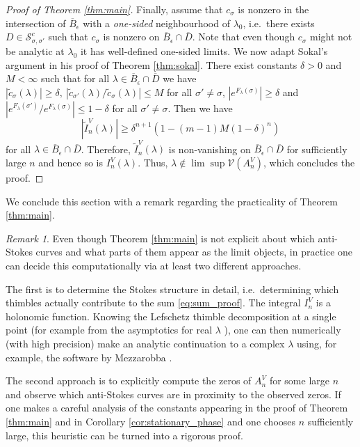 \documentclass[11pt, a4paper]{article}
\numberwithin{theorem}{section}
\theoremstyle{remark}
\newtheorem{remark}[theorem]{Remark}
\newcommand{\V}{\mathcal{V}}
\newcommand{\cS}{\mathcal{S}}
\theoremstyle{theorem}
\begin{document}
\begin{proof}[Proof of Theorem \ref{thm:main}]
  Finally, assume that $c_\sigma$ is nonzero in the intersection of $\overline{B}_\epsilon$ with a \emph{one-sided} neighbourhood of $\lambda_0$, i.e.\ there exists $D\in \cS^c_{\sigma,\sigma'}$ such that $c_\sigma$ is nonzero on $\overline{B}_\epsilon \cap \overline{D}$. 
  Note that even though $c_\sigma$ might not be analytic at $\lambda_0$ it has well-defined one-sided limits. We now adapt Sokal's argument in his proof of Theorem \ref{thm:sokal}. There exist constants $\delta > 0$ and $M < \infty$ such that for all $\lambda\in \overline{B}_\epsilon \cap \overline{D}$ we have $|\tilde{c}_\sigma(\lambda)| \geq \delta,~ | \tilde{c}_{\sigma'}(\lambda) / \tilde{c}_{\sigma}(\lambda) | \leq M$ for all $\sigma'\neq \sigma$, $|e^{F_\lambda(\sigma)}| \geq \delta$ and $| e^{F_\lambda(\sigma')} / e^{F_\lambda(\sigma)} | \leq 1-\delta$ for all $\sigma'\neq \sigma$. Then we have
  \[
    |\tilde{I}_n^V(\lambda)| \geq \delta^{n+1}\left( 1 - (m-1)M(1-\delta)^n \right)
  \]
  for all $\lambda\in \overline{B}_\epsilon \cap \overline{D}$. Therefore, $\tilde{I}_n^V(\lambda)$ is non-vanishing on $\overline{B}_\epsilon \cap \overline{D}$ for sufficiently large $n$ and hence so is $I_n^V(\lambda)$. Thus, $\lambda \notin \lim\sup \V(A_n^V)$, which concludes the proof.
\end{proof}

We conclude this section with a remark regarding the practicality of Theorem \ref{thm:main}.

\begin{remark}
  \label{rem:practicalities}
  Even though Theorem \ref{thm:main} is not explicit about which anti-Stokes curves and what parts of them appear as the limit objects, in practice one can decide this computationally via at least two different approaches.\par
  The first is to determine the Stokes structure in detail, i.e.\ determining which thimbles actually contribute to the sum \eqref{eq:sum_proof}. The integral $I_n^V$ is a holonomic function. Knowing the Lefschetz thimble decomposition at a single point (for example from the asymptotics for real $\lambda$ \cite{multicolor}), one can then numerically (with high precision) make an analytic continuation to a complex $\lambda$ using, for example, the software by Mezzarobba \cite{mezzarobba2016rigorous}.\par
  The second approach is to explicitly compute the zeros of $A_n^V$ for some large $n$ and observe which anti-Stokes curves are in proximity to the observed zeros. If one makes a careful analysis of the constants appearing in the proof of Theorem \ref{thm:main} and in Corollary \ref{cor:stationary_phase} and one chooses $n$ sufficiently large, this heuristic can be turned into a rigorous proof.
\end{remark}
\end{document}
